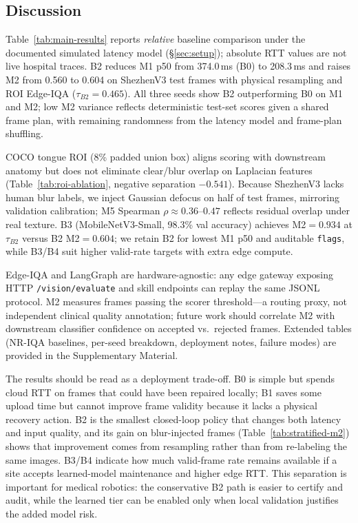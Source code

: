 \subsection{Discussion}
\label{sec:discussion}

Table~\ref{tab:main-results} reports \emph{relative} baseline comparison under the documented simulated latency model (\S\ref{sec:setup}); absolute RTT values are not live hospital traces.
B2 reduces M1 p50 from 374.0\,ms (B0) to 208.3\,ms and raises M2 from 0.560 to 0.604 on ShezhenV3 test frames with physical resampling and ROI Edge-IQA ($\tau_{B2}{=}0.465$).
All three seeds show B2 outperforming B0 on M1 and M2; low M2 variance reflects deterministic test-set scores given a shared frame plan, with remaining randomness from the latency model and frame-plan shuffling.

COCO tongue ROI (8\% padded union box) aligns scoring with downstream anatomy but does not eliminate clear/blur overlap on Laplacian features (Table~\ref{tab:roi-ablation}, negative separation $-0.541$).
Because ShezhenV3 lacks human blur labels, we inject Gaussian defocus on half of test frames, mirroring validation calibration; M5 Spearman $\rho{\approx}0.36$--$0.47$ reflects residual overlap under real texture.
B3 (MobileNetV3-Small, 98.3\% val accuracy) achieves M2$=0.934$ at $\tau_{B2}$ versus B2 M2$=0.604$; we retain B2 for lowest M1 p50 and auditable \texttt{flags}, while B3/B4 suit higher valid-rate targets with extra edge compute.

Edge-IQA and LangGraph are hardware-agnostic: any edge gateway exposing HTTP \texttt{/vision/evaluate} and skill endpoints can replay the same JSONL protocol.
M2 measures frames passing the scorer threshold---a routing proxy, not independent clinical quality annotation; future work should correlate M2 with downstream classifier confidence on accepted vs.\ rejected frames.
Extended tables (NR-IQA baselines, per-seed breakdown, deployment notes, failure modes) are provided in the Supplementary Material.

The results should be read as a deployment trade-off.
B0 is simple but spends cloud RTT on frames that could have been repaired locally; B1 saves some upload time but cannot improve frame validity because it lacks a physical recovery action.
B2 is the smallest closed-loop policy that changes both latency and input quality, and its gain on blur-injected frames (Table~\ref{tab:stratified-m2}) shows that improvement comes from resampling rather than from re-labeling the same images.
B3/B4 indicate how much valid-frame rate remains available if a site accepts learned-model maintenance and higher edge RTT.
This separation is important for medical robotics: the conservative B2 path is easier to certify and audit, while the learned tier can be enabled only when local validation justifies the added model risk.
